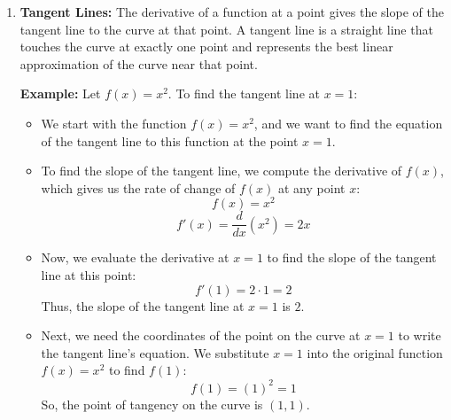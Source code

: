 \begin{enumerate}
    \begin{center}
    \end{center}

    \item \textbf{Tangent Lines:} The derivative of a function at a point gives the slope of the tangent line to the curve at that point. A tangent line is a straight line that touches the curve at exactly one point and represents the best linear approximation of the curve near that point.

    \textbf{Example:} Let \( f(x) = x^2 \). To find the tangent line at \( x = 1 \):
    \begin{itemize}
        \item We start with the function \( f(x) = x^2 \), and we want to find the equation of the tangent line to this function at the point \( x = 1 \).
    
        \item To find the slope of the tangent line, we compute the derivative of \( f(x) \), which gives us the rate of change of \( f(x) \) at any point \( x \):
        \[
        f(x) = x^2
        \]
        \[
        f'(x) = \frac{d}{dx}(x^2) = 2x
        \]
    
        \item Now, we evaluate the derivative at \( x = 1 \) to find the slope of the tangent line at this point:
        \[
        f'(1) = 2 \cdot 1 = 2
        \]
        Thus, the slope of the tangent line at \( x = 1 \) is \( 2 \).
    
        \item Next, we need the coordinates of the point on the curve at \( x = 1 \) to write the tangent line's equation. We substitute \( x = 1 \) into the original function \( f(x) = x^2 \) to find \( f(1) \):
        \[
        f(1) = (1)^2 = 1
        \]
        So, the point of tangency on the curve is \( (1, 1) \).
    

\end{itemize}
\end{enumerate}
